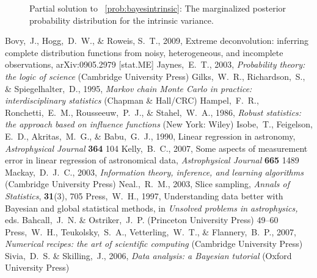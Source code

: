 \documentclass[12pt,twoside,pdftex]{article}
\begin{document}
\begin{figure}[htbp]
\caption{Partial solution to \problemname~\ref{prob:bayesintrinsic}:
The marginalized posterior probability distribution for the intrinsic
variance.}\label{fig:bayesintrinsic}
\end{figure}

\clearpage
{}\theendnotes

\clearpage
\begin{thebibliography}{}
  Bovy,~J., Hogg,~D.~W., \& Roweis, S.~T., 2009,
  Extreme deconvolution: inferring complete distribution functions from noisy, heterogeneous, and incomplete observations, 
  arXiv:0905.2979 [stat.ME]
  Jaynes,~E.~T., 2003,
  \textit{Probability theory: the logic of science} (Cambridge University Press)
  Gilks,~W.~R., Richardson,~S., \& Spiegelhalter,~D., 1995,
  \textit{Markov chain Monte Carlo in practice: interdisciplinary statistics} (Chapman \& Hall/CRC)
  Hampel,~F.~R., Ronchetti,~E.~M., Rousseeuw,~P.~J., \& Stahel,~W.~A., 1986, 
  \textit{Robust statistics: the approach based on influence functions} (New York: Wiley)
  Isobe,~T., Feigelson, E.~D., Akritas,~M.~G., \& Babu,~G.~J., 1990,
  Linear regression in astronomy,
  \textit{Astrophysical Journal} \textbf{364} 104
  Kelly,~B.~C., 2007,
  Some aspects of measurement error in linear regression of astronomical data,
  \textit{Astrophysical Journal} \textbf{665} 1489
  Mackay,~D.~J.~C., 2003,
  \textit{Information theory, inference, and learning algorithms} (Cambridge University Press)
  Neal.,~R.~M., 2003,
  Slice sampling,
  \textit{Annals of Statistics}, \textbf{31}(3), 705
  Press,~W.~H., 1997,
  Understanding data better with Bayesian and global statistical methods,
  in \textit{Unsolved problems in astrophysics,}
  eds. Bahcall,~J.~N. \& Ostriker,~J.~P. (Princeton University Press)
  49--60
  Press,~W.~H., Teukolsky,~S.~A., Vetterling,~W.~T., \& Flannery,~B.~P., 2007,
  \textit{Numerical recipes: the art of scientific computing} (Cambridge University Press)
  Sivia,~D.~S. \& Skilling,~J., 2006,
  \textit{Data analysis: a Bayesian tutorial} (Oxford University Press)
\end{thebibliography}
\end{document}
